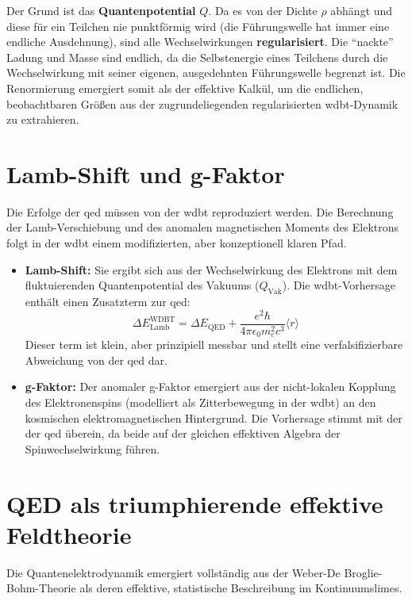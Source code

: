 Der Grund ist das \textbf{Quantenpotential} $Q$. Da es von der Dichte $\rho$ abhängt und diese für ein Teilchen nie punktförmig wird (die Führungswelle hat immer eine endliche Ausdehnung), sind alle
Wechselwirkungen \textbf{regularisiert}. Die \enquote{nackte} Ladung und Masse sind endlich, da die Selbstenergie eines Teilchens durch die Wechselwirkung mit seiner eigenen, ausgedehnten Führungswelle
begrenzt ist. Die Renormierung emergiert somit als der effektive Kalkül, um die endlichen, beobachtbaren Größen aus der zugrundeliegenden regularisierten \gls{wdbt}-Dynamik zu extrahieren.

\section{Lamb-Shift und g-Faktor}
Die Erfolge der \gls{qed} müssen von der \gls{wdbt} reproduziert werden. Die Berechnung der Lamb-Verschiebung und des anomalen magnetischen Moments des Elektrons folgt in der \gls{wdbt} einem
modifizierten, aber konzeptionell klaren Pfad.

\begin{itemize}
    \item \textbf{Lamb-Shift:} Sie ergibt sich aus der Wechselwirkung des Elektrons mit dem fluktuierenden Quantenpotential des Vakuums ($Q_\text{Vak}$). Die \gls{wdbt}-Vorhersage enthält einen Zusatzterm zur \gls{qed}:
    \begin{equation}
        \Delta E_{\text{Lamb}}^{\text{WDBT}} = \Delta E_{\text{QED}} + \frac{e^2 \hbar}{4\pi \epsilon_0 m_e^2 c^3} \langle r \rangle
    \end{equation}
    Dieser term ist klein, aber prinzipiell messbar und stellt eine verfalsifizierbare Abweichung von der \gls{qed} dar.
    \item \textbf{g-Faktor:} Der anomaler g-Faktor emergiert aus der nicht-lokalen Kopplung des Elektronenspins (modelliert als Zitterbewegung in der \gls{wdbt}) an den kosmischen elektromagnetischen Hintergrund. Die Vorhersage stimmt mit der der \gls{qed} überein, da beide auf der gleichen effektiven Algebra der Spinwechselwirkung führen.
\end{itemize}

\section{QED als triumphierende effektive Feldtheorie}
Die Quantenelektrodynamik emergiert vollständig aus der Weber-De Broglie-Bohm-Theorie als deren effektive, statistische Beschreibung im Kontinuumslimes.

